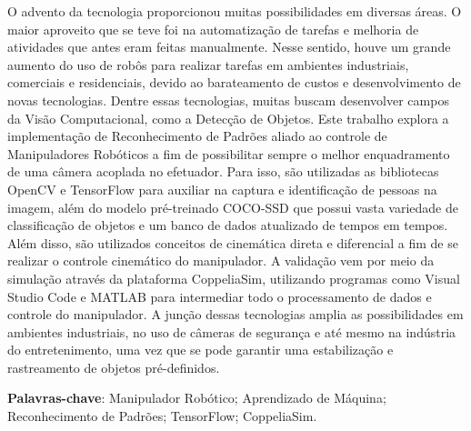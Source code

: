
\begin{resumo}

O advento da tecnologia proporcionou muitas possibilidades em diversas áreas. O maior aproveito que se teve foi na automatização de tarefas e melhoria de atividades que antes eram feitas manualmente. Nesse sentido, houve um grande aumento do uso de robôs para realizar tarefas em ambientes industriais, comerciais e residenciais, devido ao barateamento de custos e desenvolvimento de novas tecnologias. Dentre essas tecnologias, muitas buscam desenvolver campos da Visão Computacional, como a Detecção de Objetos. Este trabalho explora a implementação de Reconhecimento de Padrões aliado ao controle de Manipuladores Robóticos a fim de possibilitar sempre o melhor enquadramento de uma câmera acoplada no efetuador. Para isso, são utilizadas as bibliotecas OpenCV e TensorFlow para auxiliar na captura e identificação de pessoas na imagem, além do modelo pré-treinado COCO-SSD que possui vasta variedade de classificação de objetos e um banco de dados atualizado de tempos em tempos. Além disso, são utilizados conceitos de cinemática direta e diferencial a fim de se realizar o controle cinemático do manipulador. A validação vem por meio da simulação através da plataforma CoppeliaSim, utilizando programas como Visual Studio Code e MATLAB para intermediar todo o processamento de dados e controle do manipulador. A junção dessas tecnologias amplia as possibilidades em ambientes industriais, no uso de câmeras de segurança e até mesmo na indústria do entretenimento, uma vez que se pode garantir uma estabilização e rastreamento de objetos pré-definidos.

\vspace{\onelineskip}
 
  \noindent 

 \textbf{Palavras-chave}: Manipulador Robótico; Aprendizado de Máquina; Reconhecimento de Padrões; TensorFlow; CoppeliaSim.
\end{resumo}